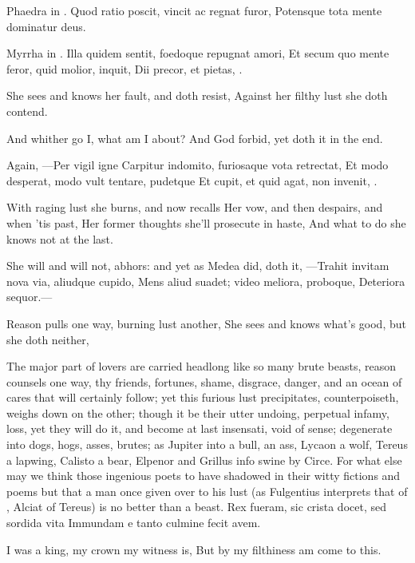 Phaedra in \Seneca{}.
Quod ratio poscit, vincit ac regnat furor,
Potensque tota mente dominatur deus.

Myrrha in . \Ovid
Illa quidem sentit, foedoque repugnat amori,
Et secum quo mente feror, quid molior, inquit,
Dii precor, et pietas, \etc{}.


She sees and knows her fault, and doth resist,
Against her filthy lust she doth contend.

And whither go I, what am I about?
And God forbid, yet doth it in the end.

Again,
---Per vigil igne
Carpitur indomito, furiosaque vota retrectat,
Et modo desperat, modo vult tentare, pudetque
Et cupit, et quid agat, non invenit, \etc{}.

With raging lust she burns, and now recalls
Her vow, and then despairs, and when 'tis past,
Her former thoughts she'll prosecute in haste,
And what to do she knows not at the last.

She will and will not, abhors: and yet as Medea did, doth it,
---Trahit invitam nova via, aliudque cupido,
Mens aliud suadet; video meliora, proboque,
Deteriora sequor.---

Reason pulls one way, burning lust another,
She sees and knows what's good, but she doth neither,


The major part of lovers are carried headlong like so many brute
beasts, reason counsels one way, thy friends, fortunes, shame,
disgrace, danger, and an ocean of cares that will certainly follow; yet
this furious lust precipitates, counterpoiseth, weighs down on the
other; though it be their utter undoing, perpetual infamy, loss, yet
they will do it, and become at last insensati, void of sense;
degenerate into dogs, hogs, asses, brutes; as Jupiter into a bull,
\Apuleius an ass, Lycaon a wolf, Tereus a lapwing, Calisto a bear,
Elpenor and Grillus info swine by Circe. For what else may we think
those ingenious poets to have shadowed in their witty fictions and
poems but that a man once given over to his lust (as Fulgentius
interprets that of \Apuleius, Alciat of Tereus) is no better than a
beast.
Rex fueram, sic crista docet, sed sordida vita
Immundam e tanto culmine fecit avem.

I was a king, my crown my witness is,
But by my filthiness am come to this.

